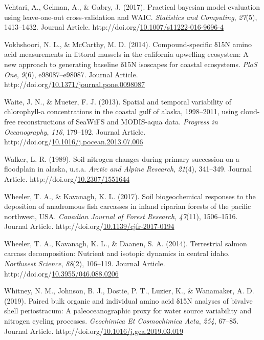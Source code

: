 \documentclass [11pt, proquest] {uwthesis}[2015/03/03]
\newlength{\cslhangindent}
\newenvironment{CSLReferences}%
{\setlength{\parindent}{0pt}%
\everypar{\setlength{\hangindent}{\cslhangindent}}\ignorespaces}%
{\par}
\begin{document}
\begin{CSLReferences}{1}{0}
\leavevmode\hypertarget{ref-Vehtari2017}{}%
Vehtari, A., Gelman, A., \& Gabry, J. (2017). Practical bayesian model evaluation using leave-one-out cross-validation and WAIC. \emph{Statistics and Computing}, \emph{27}(5), 1413--1432. Journal Article. http://doi.org/\href{https://doi.org/10.1007/s11222-016-9696-4}{10.1007/s11222-016-9696-4}

\leavevmode\hypertarget{ref-Vokshoori2014}{}%
Vokhshoori, N. L., \& McCarthy, M. D. (2014). Compound-specific δ15N amino acid measurements in littoral mussels in the california upwelling ecosystem: A new approach to generating baseline δ15N isoscapes for coastal ecosystems. \emph{PloS One}, \emph{9}(6), e98087--e98087. Journal Article. http://doi.org/\href{https://doi.org/10.1371/journal.pone.0098087}{10.1371/journal.pone.0098087}

\leavevmode\hypertarget{ref-Waite2013}{}%
Waite, J. N., \& Mueter, F. J. (2013). Spatial and temporal variability of chlorophyll-a concentrations in the coastal gulf of alaska, 1998--2011, using cloud-free reconstructions of SeaWiFS and MODIS-aqua data. \emph{Progress in Oceanography}, \emph{116}, 179--192. Journal Article. http://doi.org/\href{https://doi.org/10.1016/j.pocean.2013.07.006}{10.1016/j.pocean.2013.07.006}

\leavevmode\hypertarget{ref-Walker1989}{}%
Walker, L. R. (1989). Soil nitrogen changes during primary succession on a floodplain in alaska, u.s.a. \emph{Arctic and Alpine Research}, \emph{21}(4), 341--349. Journal Article. http://doi.org/\href{https://doi.org/10.2307/1551644}{10.2307/1551644}

\leavevmode\hypertarget{ref-Wheeler2017}{}%
Wheeler, T. A., \& Kavanagh, K. L. (2017). Soil biogeochemical responses to the deposition of anadromous fish carcasses in inland riparian forests of the pacific northwest, USA. \emph{Canadian Journal of Forest Research}, \emph{47}(11), 1506--1516. Journal Article. http://doi.org/\href{https://doi.org/10.1139/cjfr-2017-0194}{10.1139/cjfr-2017-0194}

\leavevmode\hypertarget{ref-Wheeler2014}{}%
Wheeler, T. A., Kavanagh, K. L., \& Daanen, S. A. (2014). Terrestrial salmon carcass decomposition: Nutrient and isotopic dynamics in central idaho. \emph{Northwest Science}, \emph{88}(2), 106--119. Journal Article. http://doi.org/\href{https://doi.org/10.3955/046.088.0206}{10.3955/046.088.0206}

\leavevmode\hypertarget{ref-Whitney2019}{}%
Whitney, N. M., Johnson, B. J., Dostie, P. T., Luzier, K., \& Wanamaker, A. D. (2019). Paired bulk organic and individual amino acid δ15N analyses of bivalve shell periostracum: A paleoceanographic proxy for water source variability and nitrogen cycling processes. \emph{Geochimica Et Cosmochimica Acta}, \emph{254}, 67--85. Journal Article. http://doi.org/\href{https://doi.org/10.1016/j.gca.2019.03.019}{10.1016/j.gca.2019.03.019}


\end{CSLReferences}
\end{document}
